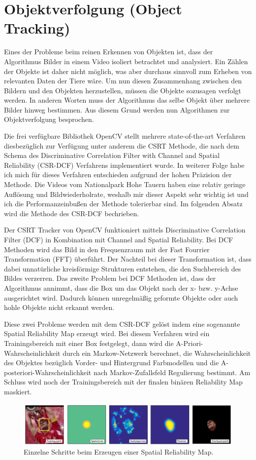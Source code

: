 \section{Objektverfolgung (Object Tracking)}
Eines der Probleme beim reinen Erkennen von Objekten ist, dass der Algorithmus Bilder in einem Video isoliert betrachtet und analysiert. Ein Zählen der Objekte ist daher nicht möglich, was aber durchaus sinnvoll zum Erheben von relevanten Daten der Tiere wäre. Um nun diesen Zusammenhang zwischen den Bildern und den Objekten herzustellen, müssen die Objekte sozusagen verfolgt werden. In anderen Worten muss der Algorithmus das selbe Objekt über mehrere Bilder hinweg bestimmen. Aus diesem Grund werden nun Algorithmen zur Objektverfolgung besprochen.\par
Die frei verfügbare Bibliothek OpenCV stellt mehrere state-of-the-art Verfahren diesbezüglich zur Verfügung unter anderem die CSRT Methode, die nach dem Schema des Discriminative Correlation Filter with Channel and Spatial Reliability (CSR-DCF) Verfahrens implementiert wurde. In weiterer Folge habe ich mich für dieses Verfahren entschieden aufgrund der hohen Präzision der Methode. Die Videos vom Nationalpark Hohe Tauern haben eine relativ geringe Auflösung und Bildwiederholrate, weshalb mir dieser Aspekt sehr wichtig ist und ich die Performanzeinbußen der Methode tolerierbar sind. Im folgenden Absatz wird die Methode des CSR-DCF \cite{ObjectTrackingCSRDCF} bechrieben.\par
Der CSRT Tracker von OpenCV funktioniert mittels Discriminative Correlation Filter (DCF) in Kombination mit Channel and Spatial Reliability. Bei DCF Methoden wird das Bild in den Frequenzraum mit der Fast Fourrier Transformation (FFT) überführt. Der Nachteil bei dieser Transformation ist, dass dabei unnatürliche kreisförmige Strukturen entstehen, die den Suchbereich des Bildes verzerren. Das zweite Problem bei DCF Methoden ist, dass der Algorithmus annimmt, dass die Box um das Objekt nach der x- bzw. y-Achse ausgerichtet wird. Dadurch können unregelmäßig geformte Objekte oder auch hohle Objekte nicht erkannt werden.\par
Diese zwei Probleme werden mit dem CSR-DCF gelöst indem eine sogenannte Spatial Reliability Map erzeugt wird. Bei diesem Verfahren wird ein Trainingsbereich mit einer Box festgelegt, dann wird die A-Priori-Wahrscheinlichkeit durch ein Markow-Netzwerk berechnet, die Wahrscheinlichkeit des Objektes bezüglich Vorder- und Hintergrund Farbmodellen und die A-posteriori-Wahrscheinlichkeit nach Markov-Zufallsfeld Regulierung bestimmt. Am Schluss wird noch der Trainingsbereich mit der finalen binären Reliability Map maskiert.
\newpage
\begin{figure}[h]
    \centering
    \includegraphics[width=\linewidth]{images/CSR_DCF_Pipeline.png}
    \caption{Einzelne Schritte beim Erzeugen einer Spatial Reliability Map.}
\end{figure}

